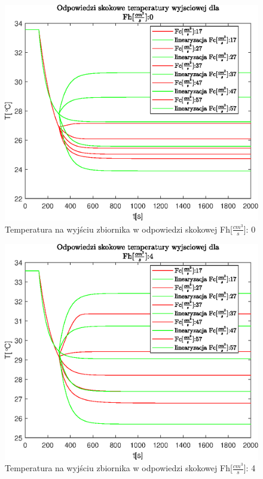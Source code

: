 \begin{figure}[h!]
   \centering
   \includegraphics{img/step-responses/Tout/stepResponseToutFh0.eps}
   \caption{Temperatura na wyjściu zbiornika w odpowiedzi skokowej Fh[$\frac{cm^3}{s}$]: 0}
   \label{fig:stepResponseToutFh0}
\end{figure}
            
\begin{figure}[h!]
   \centering
   \includegraphics{img/step-responses/Tout/stepResponseToutFh4.eps}
   \caption{Temperatura na wyjściu zbiornika w odpowiedzi skokowej Fh[$\frac{cm^3}{s}$]: 4}
   \label{fig:stepResponseToutFh4}
\end{figure}
            
